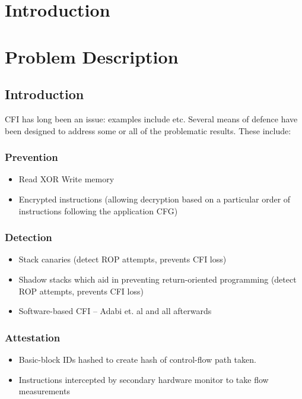 \section{Introduction}
\section{Problem Description}
\subsection{Introduction}

CFI has long been an issue: examples include etc. Several means of defence have been designed to address some or all of the problematic results. These include:

\subsubsection{Prevention}
\begin{itemize}
	\item Read XOR Write memory
	\item Encrypted instructions (allowing decryption based on a particular order of instructions following the application CFG)
\end{itemize}

\subsubsection{Detection}
\begin{itemize}
	\item Stack canaries (detect ROP attempts, prevents CFI loss)
	\item Shadow stacks which aid in preventing return-oriented programming (detect ROP attempts, prevents CFI loss)
	\item Software-based CFI – Adabi et. al \cite{Abadi2005} and all afterwards
\end{itemize}

\subsubsection{Attestation}
\begin{itemize}
	\item Basic-block IDs hashed to create hash of control-flow path taken.
	\item Instructions intercepted by secondary hardware monitor to take flow measurements 
\end{itemize}

